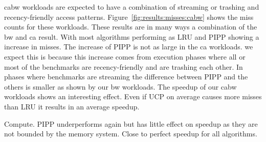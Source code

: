 cabw workloads are expected to have a combination of streaming or trashing and recency-friendly access patterns.
Figure~\ref{fig:results:misses:cabw} shows the miss counts for these workloads. 
These results are in many ways a combination of the bw and ca result. 
With most algorithms performing as LRU and PIPP showing a increase in misses.
The increase of PIPP is not as large in the ca workloads.
we expect this is because this increase comes from execution phases where all or most of the benchmarks are recency-friendly and are trashing each other.
In phases where benchmarks are streaming the difference between PIPP and the others is smaller as shown by our bw workloads.
The speedup of our cabw workloads shows an interesting effect.
Even if UCP on average causes more misses than LRU it results in an average speedup.

Compute. PIPP underperforms again but has little effect on speedup as they are not bounded by the memory system. Close to perfect speedup for all algorithms.

